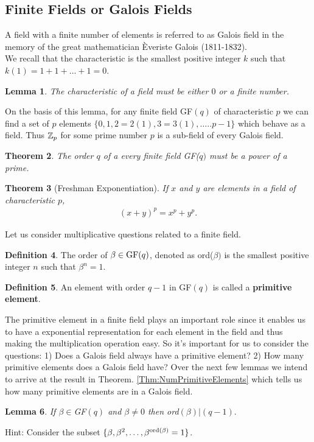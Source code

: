\documentclass[12pt]{article}
\newtheorem{thm}{Theorem}
\newtheorem{lem}[thm]{Lemma}
\theoremstyle{definition}
\newtheorem{defn}[thm]{Definition}
\begin{document}
\subsection{Finite Fields or Galois Fields}
A field with a finite number of elements is referred to as Galois field in the memory of the great mathematician \`{E}veriste Galois (1811-1832).\\
We recall that the characteristic is the smallest positive integer  $k$ such that $k(1)=1+1+\ldots +1=0$.
\begin{lem}
The characteristic of a field must be either $0$ or a finite number.
\end{lem}
On the basis of this lemma, for any finite field GF$(q)$ of characteristic $p$ we can find a set of $p$ elements $\{0,1,2=2(1),3=3(1),\ldots..p-1\}$ which behave as a field. Thus $\mathbb{Z}_p$ for some prime number $p$ is a sub-field of every Galois field.

\begin{thm}
The order $q$ of a every finite field GF($q)$ must be a power of a prime.
\end{thm}

\begin{thm}[Freshman Exponentiation]
If $x$ and $y$ are elements in a field of characteristic $p$,
\begin{align*}
(x+y)^p=x^p+y^p.
\end{align*}
\end{thm}

Let us consider multiplicative questions related to a finite field.
\begin{defn}
The order of $\beta\in \text{GF}(q)$, denoted as ord($\beta)$ is the smallest positive integer $n$ such that $\beta^n =1$. 
\end{defn}

\begin{defn}
An element with order $q-1$ in GF$(q)$ is called a \textbf{primitive element}.
\end{defn}
The primitive element in a finite field plays an important role since it enables us to have a exponential representation for each element in the field and thus making the multiplication operation easy. So it's important for us to consider the questions: 1) Does a Galois field always have a primitive element? 2) How many primitive elements does a Galois field have? Over the next few lemmas we intend to arrive at the result in Theorem. \ref{Thm:NumPrimitiveElements} which tells us how many primitive elements are in a Galois field.
\begin{lem}
\label{Lem:OrderDividesq-1}
If $\beta\in$GF$(q)$ and $\beta\neq 0$ then ord$(\beta)|(q-1).$
\end{lem}
Hint: Consider the subset $\{\beta,\beta^2,\ldots,\beta^{\text{ord}(\beta)}=1\}$.
\end{document}
